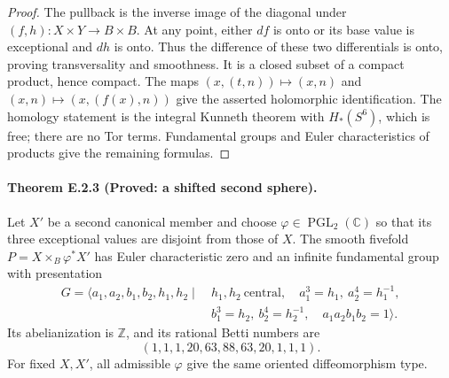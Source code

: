 \begin{proof}
The pullback is the inverse image of the diagonal under
$(f,h):X\times Y\to B\times B$.  At any point, either $df$ is
onto or its base value is exceptional and $dh$ is onto.  Thus
the difference of these two differentials is onto, proving
transversality and smoothness.  It is a closed subset of a
compact product, hence compact.  The maps
$(x,(t,n))\mapsto(x,n)$ and $(x,n)\mapsto(x,(f(x),n))$ give
the asserted holomorphic identification.  The homology statement
is the integral Kunneth theorem with $H_*(S^6)$, which is free;
there are no Tor terms.  Fundamental groups and Euler
characteristics of products give the remaining formulas.
\end{proof}

\paragraph{Theorem E.2.3 (Proved: a shifted second sphere).}
Let $X'$ be a second canonical member and choose $\varphi\in
\operatorname{PGL}_2(\mathbb C)$ so that its three exceptional
values are disjoint from those of $X$.  The smooth fivefold
$P=X\times_B\varphi^*X'$ has Euler characteristic zero and
an infinite fundamental group with presentation
\[
\begin{split}
G=\langle a_1,a_2,b_1,b_2,h_1,h_2\mid\ &
 h_1,h_2\ \text{central},\quad
 a_1^3=h_1,\ a_2^4=h_1^{-1},\\
 &b_1^3=h_2,\ b_2^4=h_2^{-1},\quad
 a_1a_2b_1b_2=1\rangle .
\end{split}
\tag{E.16}
\]
Its abelianization is $\mathbb Z$, and its rational Betti numbers are
\[
 (1,1,1,20,63,88,63,20,1,1,1).
 \tag{E.17}
\]
For fixed $X,X'$, all admissible $\varphi$ give the same oriented
diffeomorphism type.

